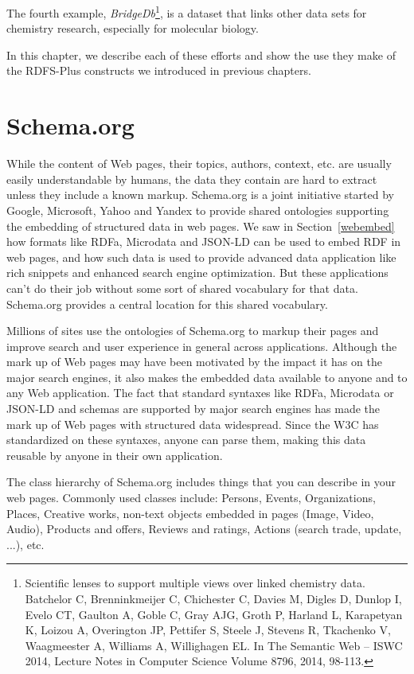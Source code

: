 The fourth example, \emph{BridgeDb}\footnote{Scientific lenses to support multiple views over linked chemistry data. Batchelor C, Brenninkmeijer C, Chichester C, Davies M, Digles D, Dunlop I, Evelo CT, Gaulton A, Goble C, Gray AJG, Groth P, Harland L, Karapetyan K, Loizou A, Overington JP, Pettifer S, Steele J, Stevens R, Tkachenko V, Waagmeester A, Williams A, Willighagen EL. In The Semantic Web – ISWC 2014, Lecture Notes in Computer Science Volume 8796, 2014, 98-113.}, is a dataset that links other data
sets for chemistry research, especially for molecular biology. 


In this chapter, we describe each of these efforts and show the use they
make of the RDFS-Plus constructs we introduced in previous chapters.

\section{Schema.org}
\label{schema.org}
While the content of Web pages, their topics, authors, context, etc. are usually easily 
understandable by humans, the data they contain are hard to extract unless they include a 
known markup. Schema.org is a joint initiative started by Google, Microsoft, Yahoo and 
Yandex to provide shared ontologies supporting the embedding of structured data in web 
pages. We saw in Section~\ref{webembed} how formats like RDFa, Microdata and JSON-LD can 
be used to embed RDF in web pages, and how such data is used to provide
advanced data application like rich snippets and enhanced search engine optimization. 
But these applications can't do their job without some sort of shared vocabulary 
for that data.  Schema.org provides a central location for this shared vocabulary. 

Millions of sites use the ontologies of Schema.org to markup their pages and improve search and user experience 
in general across applications. Although the mark up of Web pages may have been motivated by the impact it 
has on the major search engines, it also makes the embedded data available to anyone and to any Web application. 
The fact that standard syntaxes like RDFa, Microdata or JSON-LD and schemas are supported by major search 
engines has made the mark up of Web pages with structured data  widespread.  Since the W3C has standardized on these
syntaxes, anyone can parse them, making this data reusable by anyone in their own application. 


The class hierarchy of Schema.org includes things that you can describe in 
your web pages. 
Commonly used classes include: Persons, Events, Organizations, Places, Creative works, non-text objects embedded in pages (Image, Video, Audio), Products and offers, Reviews and ratings, Actions (search trade, update, ...), etc.

